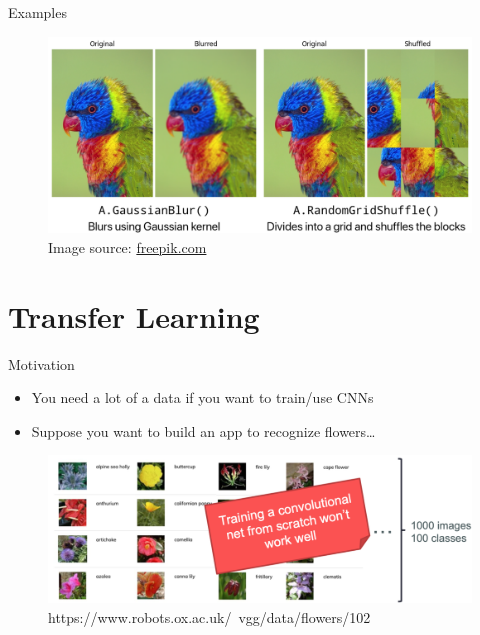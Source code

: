 \documentclass[serif, aspectratio=169]{beamer}
\begin{document}
\begin{frame}{Examples}	

	\begin{figure}
		\begin{center}
			\includegraphics[keepaspectratio, scale=0.3]{pic/Albu_example}
			\caption*{Image source: \href{http://freepik.com}{\color{blue}freepik.com}}
		\end{center}
	\end{figure}
\end{frame}

\section{Transfer Learning}
\begin{frame}{Motivation}
	\begin{itemize}
		\item You need a lot of a data if you want to train/use CNNs
		\item Suppose you want to build an app to recognize flowers…
	\end{itemize}
	\begin{figure}[htpb]
		\begin{center}
			\includegraphics[keepaspectratio, scale=0.25]{pic/TL_motiv}
			\caption*{\scriptsize https://www.robots.ox.ac.uk/~vgg/data/flowers/102}
		\end{center}
	\end{figure}
\end{frame}
\end{document}

